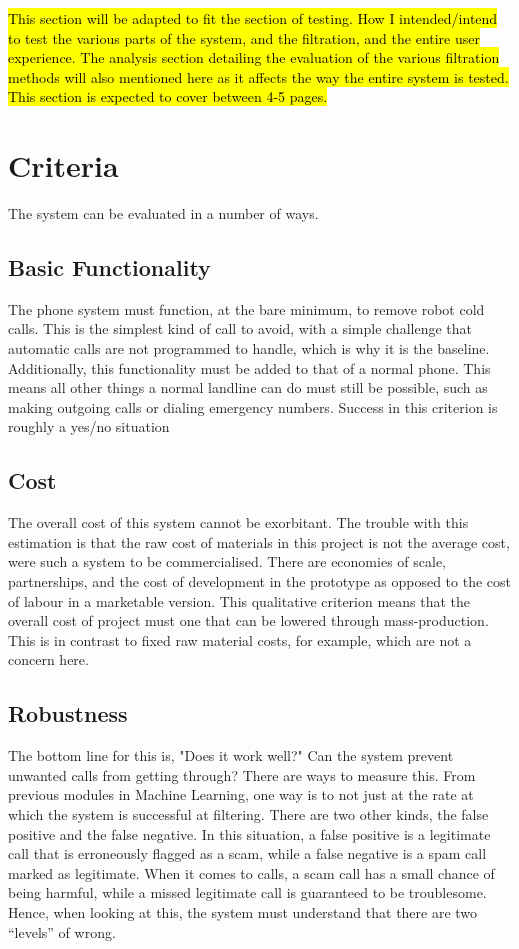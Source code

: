 \documentclass[main.tex]{subfiles}
\begin{document}
\hl{This section will be adapted to fit the section of testing. How I intended/intend to test the various parts of the system, and the filtration, and the entire user experience. The analysis section detailing the evaluation of the various filtration methods will also mentioned here as it affects the way the entire system is tested. This section is expected to cover between 4-5 pages. }

\section{Criteria}
The system can be evaluated in a number of ways.
\subsection{Basic Functionality}
The phone system must function, at the bare minimum, to remove robot cold calls. This is the simplest kind of call to avoid, with a simple challenge that automatic calls are not programmed to handle, which is why it is the baseline. Additionally, this functionality must be added to that of a normal phone. This means all other things a normal landline can do must still be possible, such as making outgoing calls or dialing emergency numbers. Success in this criterion is roughly a yes/no situation
\subsection{Cost}
The overall cost of this system cannot be exorbitant. The trouble with this estimation is that the raw cost of materials in this project is not the average cost, were such a system to be commercialised. There are economies of scale, partnerships, and the cost of development in the prototype as opposed to the cost of labour in a marketable version. This qualitative criterion means that the overall cost of project must one that can be lowered through mass-production. This is in contrast to fixed raw material costs, for example, which are not a concern here.
\subsection{Robustness}
The bottom line for this is, "Does it work well?" Can the system prevent unwanted calls from getting through? There are ways to measure this. From previous modules in Machine Learning, one way is to not just at the rate at which the system is successful at filtering. There are two other kinds, the false positive and the false negative. In this situation, a false positive is a legitimate call that is erroneously flagged as a scam, while a false negative is a spam call marked as legitimate. When it comes to calls, a scam call has a small chance of being harmful, while a missed legitimate call is guaranteed to be troublesome. Hence, when looking at this, the system must understand that there are two ``levels'' of wrong.
\end{document}
